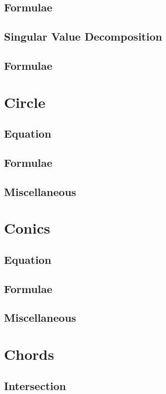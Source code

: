 \documentclass[journal]{IEEEtran}
\begin{document}
\subsection{Formulae}

\subsection{Singular Value Decomposition}

\subsection{Formulae}

\newpage
\section{Circle}
\subsection{Equation}

\subsection{Formulae}

\subsection{Miscellaneous}

\newpage
\section{Conics}
\subsection{Equation}

\subsection{Formulae}

\subsection{Miscellaneous}

\newpage
\section{Chords}
\subsection{Intersection}

\end{document}
